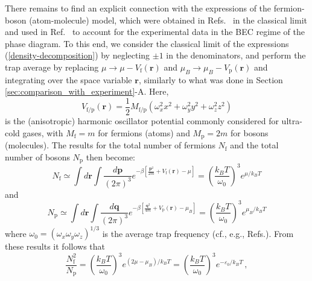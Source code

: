 \documentclass[pra,twocolumn,aps,amssymb,showpacs,superscriptaddress]{revtex4-1}
\begin{document}
There remains to find an explicit connection with the expressions of the fermion-boson (atom-molecule) model, which were obtained in Refs.~\cite{Chin-Grimm-2004,Eagles-1969} in the classical limit and used in  Ref.~\cite{Ulm-Cam-2019} to account for the experimental data in the BEC regime of the phase diagram.
To this end, we consider the classical limit of the expressions (\ref{density-decomposition}) by neglecting $\pm 1$ in the denominators, and perform the trap average by replacing 
$\mu \rightarrow \mu - V_{\mathrm{f}}(\mathbf{r})$ and $\mu_{B} \rightarrow \mu_{B} - V_{\mathrm{p}}(\mathbf{r})$ and integrating over the space variable $\mathbf{r}$, similarly to what was done in Section \ref{sec:comparison_with_experiment}-A.
Here, 
\begin{equation}
V_{\mathrm{f}/\mathrm{p}}(\mathbf{r}) = \frac{1}{2} M_{\mathrm{f}/\mathrm{p}} \left( \omega_{x}^{2} x^{2} + \omega_{y}^{2} y^{2} + \omega_{z}^{2} z^{2} \right)
\label{anisotropic-harmonic-potential-fermion-boson}
\end{equation}
is the (anisotropic) harmonic oscillator potential commonly considered for ultra-cold gases, with $M_{\mathrm{f}} = m$ for fermions (atoms) and $M_{\mathrm{p}} = 2m$  for bosons (molecules).
The results for the total number of fermions $N_{\mathrm{f}}$ and the total number of bosons $N_{\mathrm{p}}$ then become:
\begin{equation}
N_{\mathrm{f}} \simeq \! \int \!\! d\mathbf{r} \!\! \int \! \frac{d\mathbf{p}}{(2 \pi)^{3}} e^{-\beta \left[\frac{\mathbf{p}^{2}}{2m} + V_{\mathrm{f}}(\mathbf{r}) - \mu \right]} 
= \left( \! \frac{k_{B}T}{\omega_{0}} \! \right)^{3} \! e^{\mu/k_{B}T}
\label{trap-everaged-N_f}
\end{equation}
and
\begin{equation}
N_{\mathrm{p}} \simeq \! \int \!\! d\mathbf{r} \!\! \int \! \frac{d\mathbf{q}}{(2 \pi)^{3}} e^{-\beta \left[\frac{\mathbf{q}^{2}}{4m} + V_{\mathrm{p}}(\mathbf{r}) - \mu_{B} \right]} 
= \left( \! \frac{k_{B}T}{\omega_{0}} \! \right)^{3} \! e^{\mu_{B}/k_{B}T}
\label{trap-everaged-N_p}
\end{equation}
where $\omega_{0} = (\omega_{x} \omega_{y} \omega_{z})^{1/3}$ is the average trap frequency (cf., e.g., Refs.\cite{Pitaevskii_Stringari-2003,Pethick-Smith-2008}).
From these results it follows that
\begin{equation}
\frac{N_{\mathrm{f}}^{2}}{N_{\mathrm{p}}} = \left( \! \frac{k_{B}T}{\omega_{0}} \! \right)^{3} e^{(2\mu - \mu_{B})/k_{B}T} = \left( \! \frac{k_{B}T}{\omega_{0}} \! \right)^{3} e^{-\varepsilon_{0}/k_{B}T} \, ,
\label{N_f-square-over-N_p-trapped}
\end{equation}
\end{document}
